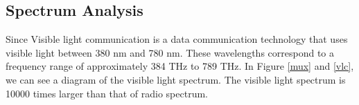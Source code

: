 %

%
%
%


\subsection {Spectrum Analysis}
Since Visible light communication is a data communication technology that uses visible light between 380 nm and 780 nm. These wavelengths correspond to a frequency range of approximately 384 THz to 789 THz. In Figure \ref{mux} and \ref{vlc}, we can see a diagram of the visible light spectrum. The visible light spectrum is 10000 times larger than that of radio spectrum.	

%

